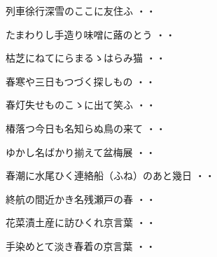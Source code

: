 \begin{shiika}列車徐行深雪のここに友住ふ
\hfill{・・}\end{shiika}
\vspace{0.6cm}
\begin{shiika}たまわりし手造り味噌に蕗のとう
\hfill{・・}\end{shiika}
\vspace{0.6cm}
\begin{shiika}枯芝にねてにらまるゝはらみ猫
\hfill{・・}\end{shiika}
\vspace{0.6cm}
\begin{shiika}春寒や三日もつづく探しもの
\hfill{・・}\end{shiika}
\vspace{0.6cm}
\begin{shiika}春灯失せものこゝに出て笑ふ
\hfill{・・}\end{shiika}
\vspace{0.6cm}
\begin{shiika}椿落つ今日も名知らぬ鳥の来て
\hfill{・・}\end{shiika}
\vspace{0.6cm}
\begin{shiika}ゆかし名ばかり揃えて盆梅展
\hfill{・・}\end{shiika}
\vspace{0.6cm}
\begin{shiika}春潮に水尾ひく連絡船（ふね）のあと幾日
\hfill{・・}\end{shiika}
\vspace{0.6cm}
\begin{shiika}終航の間近かき名残瀬戸の春
\hfill{・・}\end{shiika}
\vspace{0.6cm}
\begin{shiika}花菜漬土産に訪ひくれ京言葉
\hfill{・・}\end{shiika}
\vspace{0.6cm}
\begin{shiika}手染めとて淡き春着の京言葉
\hfill{・・}\end{shiika}
\vspace{0.6cm}

